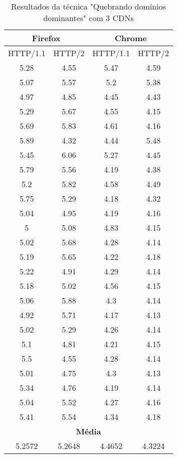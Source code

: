 \begin{table}[h]
	\centering
	\caption{Resultados da técnica "Quebrando domínios dominantes" com 3 CDNs}
	\label{resultados-quebrandodominiosdominantes-3}
	\begin{tabular}{cccc}
		\hline
		\multicolumn{2}{c}{\textbf{Firefox}} & \multicolumn{2}{c}{\textbf{Chrome}} \\
		\hline
		HTTP/1.1 & HTTP/2 & HTTP/1.1 & HTTP/2 \\
		\hline
		5.28 & 4.55 & 5.47 & 4.59 \\
		5.07 & 5.57 & 5.2  & 5.38 \\
		4.97 & 4.85 & 4.45 & 4.43 \\
		5.29 & 5.67 & 4.55 & 4.15 \\
		5.69 & 5.83 & 4.61 & 4.16 \\
		5.89 & 4.32 & 4.44 & 5.48 \\
		5.45 & 6.06 & 5.27 & 4.45 \\
		5.79 & 5.56 & 4.19 & 4.38 \\
		5.2  & 5.82 & 4.58 & 4.49 \\
		5.75 & 5.29 & 4.18 & 4.32 \\
		5.04 & 4.95 & 4.19 & 4.16 \\
		5    & 5.08 & 4.83 & 4.15 \\
		5.02 & 5.68 & 4.28 & 4.14 \\
		5.19 & 5.65 & 4.22 & 4.18 \\
		5.22 & 4.91 & 4.29 & 4.14 \\
		5.18 & 5.02 & 4.56 & 4.15 \\
		5.06 & 5.88 & 4.3  & 4.14 \\
		4.92 & 5.71 & 4.17 & 4.13 \\
		5.02 & 5.29 & 4.26 & 4.14 \\
		5.1  & 4.81 & 4.21 & 4.15 \\
		5.5  & 4.55 & 4.28 & 4.14 \\
		5.01 & 4.75 & 4.3  & 4.13 \\
		5.34 & 4.76 & 4.19 & 4.14 \\
		5.04 & 5.52 & 4.27 & 4.16 \\
		5.41 & 5.54 & 4.34 & 4.18 \\
		\hline
		\multicolumn{4}{c}{\textbf{Média}} \\
		5.2572 & 5.2648 & 4.4652 & 4.3224 \\
		\hline
	\end{tabular}
\end{table}